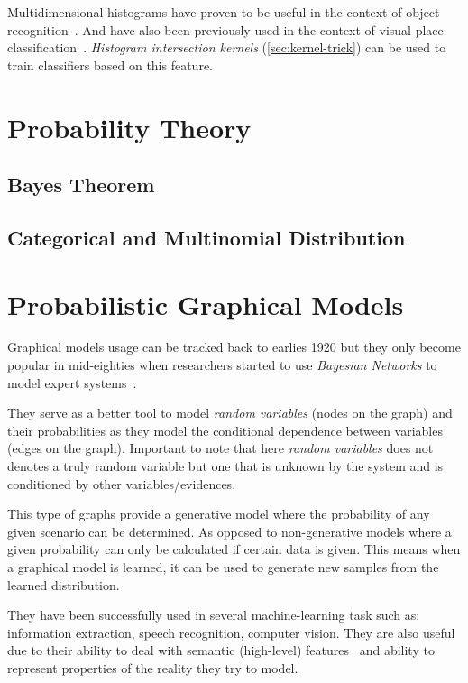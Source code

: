 Multidimensional histograms have proven to be useful in the context of object
recognition~\citep{schiele1996object}. And have also been previously used in
the context of visual place classification~\cite{pronobis2010ijrr}.
\emph{Histogram intersection kernels} (\autoref{sec:kernel-trick}) can be used
to train classifiers based on this feature.


\section{Probability Theory}
\subsection{Bayes Theorem}

\subsection{Categorical and Multinomial Distribution}

\section{Probabilistic Graphical Models}
\label{sec:graphical-models}
Graphical models usage can be tracked back to earlies 1920 but they only become
popular in mid-eighties when researchers started to use \emph{Bayesian Networks}
to model expert systems~\citep{borgelt2002graphical}.

They serve as a better tool to model \emph{random variables}
(nodes on the graph) and their probabilities as they model the conditional
dependence between variables (edges on the graph). Important to note that here
\emph{random variables} does not denotes a truly random variable but one that is
unknown by the system and is conditioned by other variables/evidences.

This type of graphs provide a generative model where the probability of any
given scenario can be determined. As opposed to non-generative models where a
given probability can only be calculated if certain data is given.
This means when a graphical model is learned, it can be used to generate new
samples from the learned distribution.

They have been successfully used in several machine-learning task such as:
information extraction, speech recognition, computer vision.
They are also useful due to their ability to deal with semantic (high-level)
features~\citep{boutell2006factor} and ability to represent properties of the
reality they try to model.

